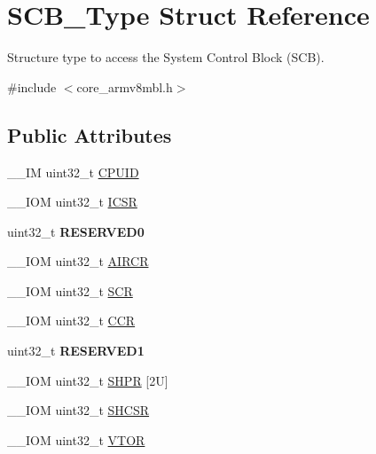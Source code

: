 \hypertarget{struct_s_c_b___type}{}\section{S\+C\+B\+\_\+\+Type Struct Reference}
\label{struct_s_c_b___type}


Structure type to access the System Control Block (S\+CB).  




{\ttfamily \#include $<$core\+\_\+armv8mbl.\+h$>$}

\subsection*{Public Attributes}
\begin{DoxyCompactItemize}
\item 
\+\_\+\+\_\+\+IM uint32\+\_\+t \mbox{\hyperlink{struct_s_c_b___type_a21e08d546d8b641bee298a459ea73e46}{C\+P\+U\+ID}}
\item 
\+\_\+\+\_\+\+I\+OM uint32\+\_\+t \mbox{\hyperlink{struct_s_c_b___type_a0ca18ef984d132c6bf4d9b61cd00f05a}{I\+C\+SR}}
\item 
\mbox{\label{struct_s_c_b___type_a10960cdc703f661c83a237d9c69db23c}} 
uint32\+\_\+t {\bfseries R\+E\+S\+E\+R\+V\+E\+D0}
\item 
\+\_\+\+\_\+\+I\+OM uint32\+\_\+t \mbox{\hyperlink{struct_s_c_b___type_ad3e5b8934c647eb1b7383c1894f01380}{A\+I\+R\+CR}}
\item 
\+\_\+\+\_\+\+I\+OM uint32\+\_\+t \mbox{\hyperlink{struct_s_c_b___type_a3a4840c6fa4d1ee75544f4032c88ec34}{S\+CR}}
\item 
\+\_\+\+\_\+\+I\+OM uint32\+\_\+t \mbox{\hyperlink{struct_s_c_b___type_a2d6653b0b70faac936046a02809b577f}{C\+CR}}
\item 
\mbox{\label{struct_s_c_b___type_adddd65958c1c4c0301f62ede0a9bf12e}} 
uint32\+\_\+t {\bfseries R\+E\+S\+E\+R\+V\+E\+D1}
\item 
\+\_\+\+\_\+\+I\+OM uint32\+\_\+t \mbox{\hyperlink{struct_s_c_b___type_ac6259676cd7892a1b62f3fa7c0930780}{S\+H\+PR}} \mbox{[}2\+U\mbox{]}
\item 
\+\_\+\+\_\+\+I\+OM uint32\+\_\+t \mbox{\hyperlink{struct_s_c_b___type_a7b5ae9741a99808043394c4743b635c4}{S\+H\+C\+SR}}
\item 
\+\_\+\+\_\+\+I\+OM uint32\+\_\+t \mbox{\hyperlink{struct_s_c_b___type_a187a4578e920544ed967f98020fb8170}{V\+T\+OR}}

\end{DoxyCompactItemize}
